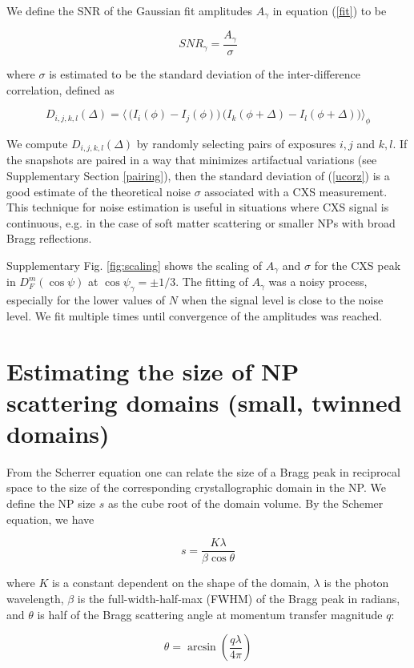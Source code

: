 \documentclass [12pt,fleqn]{article}
\def \be {\begin{equation}}
\def \ee {\end{equation}}
\begin{document}
We define the SNR of the Gaussian fit amplitudes $A_\gamma$ in equation (\ref{fit}) to be

\be
SNR_\gamma = \frac {A_\gamma  }{\sigma}
\ee

where $\sigma$ is estimated to be the standard deviation of the inter-difference correlation, defined as  

\be \label{ucorz}
D_{i,j,k,l}(\Delta) =\big
 \langle  \,\big(  I_i(\phi)-I_j(\phi) \big)\,\big( I_k( \phi + \Delta) - I_l( \phi+\Delta) \big) \big \rangle _{\phi}
\ee

We compute $D_{i,j,k,l}(\Delta)$  by randomly selecting pairs of exposures $i,j$ and $k,l$. If the snapshots are paired in a way that minimizes artifactual variations (see Supplementary Section \ref{pairing}), then the standard deviation of (\ref{ucorz}) is a good estimate of the theoretical noise $\sigma$ associated with a CXS measurement. This technique for noise estimation is useful in situations where CXS signal is continuous, e.g. in the case of soft matter scattering or smaller NPs with broad Bragg reflections.

Supplementary Fig. \ref{fig:scaling} shows the scaling of $A_\gamma$ and $\sigma$ for the CXS peak in $D^m_F(\cos \psi)$ at $\cos \psi_\gamma = \pm 1/3$. The fitting of $A_\gamma$ was a noisy process, especially for the lower values of $N$ when the signal level is close to the noise level. We fit multiple times until convergence of the amplitudes was reached.

\section{Estimating the size of NP scattering domains (small, twinned domains)} \label{widths_small}
From the Scherrer equation \cite{scherrer1969bestimmung} one can relate the size of a Bragg peak in reciprocal space to the size of the corresponding crystallographic domain in the NP. We define the NP size $s$ as the cube root of the domain volume. By the Schemer equation, we have 

\be \label{scherrer}
s = \frac{K \lambda}{\beta \cos \theta}
\ee 

where $K$ is a constant dependent on the shape of the domain, $\lambda$ is the photon wavelength, $\beta$ is the full-width-half-max (FWHM) of the Bragg peak in radians, and $\theta$ is half of the Bragg scattering angle at momentum transfer magnitude $q$:

\be
\theta = \arcsin \left ( \frac{q \lambda}{4 \pi} \right  )
\ee
\end{document}
